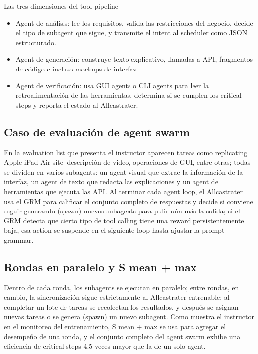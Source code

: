 \begin{knowledgebox}{Las tres dimensiones del tool pipeline}
\begin{itemize}
    \item Agent de análisis: lee los requisitos, valida las restricciones del negocio, decide el tipo de subagent que sigue, y transmite el intent al scheduler como JSON estructurado.
    \item Agent de generación: construye texto explicativo, llamadas a API, fragmentos de código e incluso mockups de interfaz.
    \item Agent de verificación: usa GUI agents o CLI agents para leer la retroalimentación de las herramientas, determina si se cumplen los critical steps y reporta el estado al Allcastrater.
\end{itemize}
\end{knowledgebox}

\subsection{Caso de evaluación de agent swarm}
En la evaluation list que presenta el instructor aparecen tareas como replicating Apple iPad Air site, descripción de video, operaciones de GUI, entre otras; todas se dividen en varios subagents: un agent visual que extrae la información de la interfaz, un agent de texto que redacta las explicaciones y un agent de herramientas que ejecuta las API. Al terminar cada agent loop, el Allcastrater usa el GRM para calificar el conjunto completo de respuestas y decide si conviene seguir generando (spawn) nuevos subagents para pulir aún más la salida; si el GRM detecta que cierto tipo de tool calling tiene una reward persistentemente baja, esa action se suspende en el siguiente loop hasta ajustar la prompt grammar.

\subsection{Rondas en paralelo y S mean + max}
Dentro de cada ronda, los subagents se ejecutan en paralelo; entre rondas, en cambio, la sincronización sigue estrictamente al Allcastrater entrenable: al completar un lote de tareas se recolectan los resultados, y después se asignan nuevas tareas o se genera (spawn) un nuevo subagent. Como muestra el instructor en el monitoreo del entrenamiento, S mean + max se usa para agregar el desempeño de una ronda, y el conjunto completo del agent swarm exhibe una eficiencia de critical steps 4.5 veces mayor que la de un solo agent.

